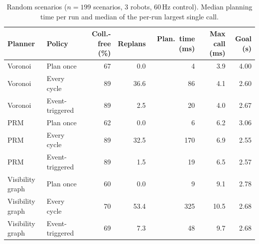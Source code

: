 \begin{table}[t]
\centering
\footnotesize
\caption{Random scenarios ($n=199$ scenarios, 3 robots, 60\,Hz control). Median planning time per run and median of the per-run largest single call.}
\label{tab:random}
\begin{tabular}{llrrrrr}
\hline
Planner & Policy & Coll.-free (\%) & Replans & Plan.\ time (ms) & Max call (ms) & Goal (s) \\
\hline
Voronoi & Plan once & 67 & 0.0 & 4 & 3.9 & 4.00 \\
Voronoi & Every cycle & 89 & 36.6 & 86 & 4.1 & 2.60 \\
Voronoi & Event-triggered & 89 & 2.5 & 20 & 4.0 & 2.67 \\
PRM & Plan once & 62 & 0.0 & 6 & 6.2 & 3.06 \\
PRM & Every cycle & 89 & 32.5 & 170 & 6.9 & 2.55 \\
PRM & Event-triggered & 89 & 1.5 & 19 & 6.5 & 2.57 \\
Visibility graph & Plan once & 60 & 0.0 & 9 & 9.1 & 2.78 \\
Visibility graph & Every cycle & 70 & 53.4 & 325 & 10.5 & 2.68 \\
Visibility graph & Event-triggered & 69 & 7.3 & 48 & 9.7 & 2.68 \\
\hline
\end{tabular}
\end{table}
